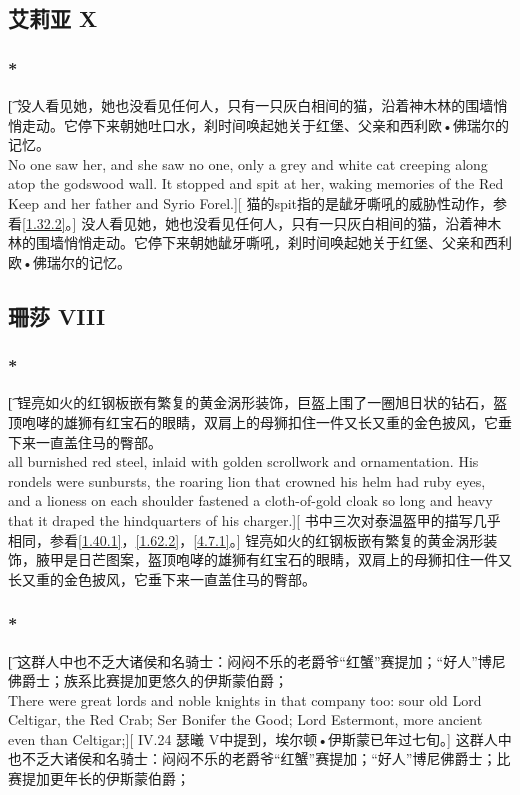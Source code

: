 \documentclass[12pt,a4paper]{article}
\begin{document}
\subsection{艾莉亚 X}
\subsubsection{\color{red}*}\label{2.64.1}\t[
	 没人看见她，她也没看见任何人，只有一只灰白相间的猫，沿着神木林的围墙悄悄走动。它停下来朝她吐口水，刹时间唤起她关于红堡、父亲和西利欧•佛瑞尔的记忆。\\
	 No one saw her, and she saw no one, only a grey and white cat creeping along atop the godswood wall. It stopped and spit at her, waking memories of the Red Keep and her father and Syrio Forel.][
	 猫的spit指的是龇牙嘶吼的威胁性动作，参看\ref{1.32.2}。]
	 没人看见她，她也没看见任何人，只有一只灰白相间的猫，沿着神木林的围墙悄悄走动。它停下来朝她龇牙嘶吼，刹时间唤起她关于红堡、父亲和西利欧•佛瑞尔的记忆。
	 
\subsection{珊莎 VIII}

\subsubsection{\color{red}*}\label{2.65.1}\t[
锃亮如火的红钢板嵌有繁复的黄金涡形装饰，巨盔上围了一圈旭日状的钻石，盔顶咆哮的雄狮有红宝石的眼睛，双肩上的母狮扣住一件又长又重的金色披风，它垂下来一直盖住马的臀部。\\
all burnished red steel, inlaid with golden scrollwork and ornamentation. His rondels were sunbursts, the roaring lion that crowned his helm had ruby eyes, and a lioness on each shoulder fastened a cloth-of-gold cloak so long and heavy that it draped the hindquarters of his charger.][
书中三次对泰温盔甲的描写几乎相同，参看\ref{1.40.1}，\ref{1.62.2}，\ref{4.7.1}。]
锃亮如火的红钢板嵌有繁复的黄金涡形装饰，腋甲是日芒图案，盔顶咆哮的雄狮有红宝石的眼睛，双肩上的母狮扣住一件又长又重的金色披风，它垂下来一直盖住马的臀部。

\subsubsection{\color{red}*}\t[
	这群人中也不乏大诸侯和名骑士：闷闷不乐的老爵爷“红蟹”赛提加；“好人”博尼佛爵士；族系比赛提加更悠久的伊斯蒙伯爵；\\
	There were great lords and noble knights in that company too: sour old Lord Celtigar, the Red Crab; Ser Bonifer the Good; Lord Estermont, more ancient even than Celtigar;][
	IV.24 瑟曦 V中提到，埃尔顿•伊斯蒙已年过七旬。]
	这群人中也不乏大诸侯和名骑士：闷闷不乐的老爵爷“红蟹”赛提加；“好人”博尼佛爵士；比赛提加更年长的伊斯蒙伯爵；
	
\end{document}
